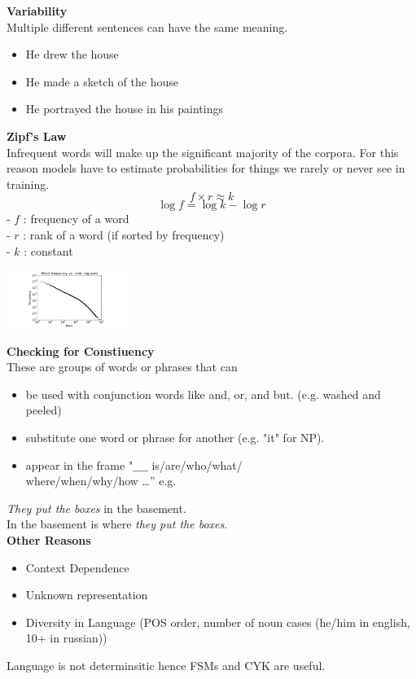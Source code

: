 \documentclass[8pt]{extarticle} %
\begin{document}
\begin{multicols*}{3}
\textbf{Variability}\\
Multiple different sentences can have the same meaning. 
\begin{itemize}[label=\textbullet, labelsep=0.3em, leftmargin=0.5em, itemsep=0em]
    \item He drew the house
    \item He made a sketch of the house
    \item He portrayed the house in his paintings
\end{itemize}

\textbf{Zipf's Law}\\
Infrequent words will make up the significant majority of the corpora.
For this reason models have to estimate probabilities for things we rarely or never see in training.
$$f\times r\approx k$$
$$\log f = \log k - \log r$$
- $f$ : frequency of a word\\
- $r$ : rank of a word (if sorted by frequency)\\
- $k$ : constant\\
\begin{center}
    \includegraphics[width=0.3\textwidth]{media/Pasted image 20240118144339.png}
\end{center}

\textbf{Checking for Constiuency}\\
These are groups of words or phrases that can
\begin{itemize}[label=\textbullet, labelsep=0.3em, leftmargin=0.5em, itemsep=0em]
\item be used with conjunction words like and, or, and but. (e.g. washed and peeled)
\item substitute one word or phrase for another (e.g. "it" for NP).
\item appear in the frame "$\_\_\_\_$ is/are/who/what/\\where/when/why/how \ldots'' e.g.
\end{itemize}   
\textit{They put the boxes} in the basement.\\
In the basement is where \textit{they put the boxes}. \\

\textbf{Other Reasons}
\begin{itemize}[label=\textbullet, labelsep=0.3em, leftmargin=0.5em, itemsep=0em]
\item Context Dependence
\item Unknown representation
\item Diversity in Language (POS order, number of noun cases (he/him in english, 10+ in russian))
\end{itemize}
Language is not determinsitic hence FSMs and CYK are useful. 


\end{multicols*}
\end{document}
